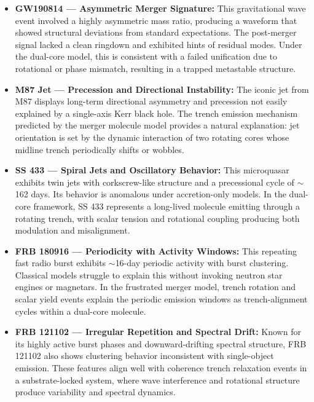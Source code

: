 \documentclass[sn-mathphys]{sn-jnl}
\theoremstyle{thmstyleone}%
\theoremstyle{thmstyletwo}%
\theoremstyle{thmstylethree}%
\begin{document}
\begin{itemize}

\item \textbf{GW190814\cite{Abbott2020} --- Asymmetric Merger Signature:}  
This gravitational wave event involved a highly asymmetric mass ratio, producing a waveform that showed structural deviations from standard expectations. The post-merger signal lacked a clean ringdown and exhibited hints of residual modes. Under the dual-core model, this is consistent with a failed unification due to rotational or phase mismatch, resulting in a trapped metastable structure.

\item \textbf{M87\cite{EHT2019} Jet --- Precession and Directional Instability:}  
The iconic jet from M87 displays long-term directional asymmetry and precession not easily explained by a single-axis Kerr black hole. The trench emission mechanism predicted by the merger molecule model provides a natural explanation: jet orientation is set by the dynamic interaction of two rotating cores whose midline trench periodically shifts or wobbles.

\item \textbf{SS 433\cite{Blundell2001} --- Spiral Jets and Oscillatory Behavior:}  
This microquasar exhibits twin jets with corkscrew-like structure and a precessional cycle of $\sim$162 days. Its behavior is anomalous under accretion-only models. In the dual-core framework, SS 433 represents a long-lived molecule emitting through a rotating trench, with scalar tension and rotational coupling producing both modulation and misalignment.

\item \textbf{FRB 180916\cite{CHIME2020} --- Periodicity with Activity Windows:}  
This repeating fast radio burst exhibits $\sim$16-day periodic activity with burst clustering. Classical models struggle to explain this without invoking neutron star engines or magnetars. In the frustrated merger model, trench rotation and scalar yield events explain the periodic emission windows as trench-alignment cycles within a dual-core molecule.

\item \textbf{FRB 121102\cite{CHIME2020} --- Irregular Repetition and Spectral Drift:}  
Known for its highly active burst phases and downward-drifting spectral structure, FRB 121102 also shows clustering behavior inconsistent with single-object emission. These features align well with coherence trench relaxation events in a substrate-locked system, where wave interference and rotational structure produce variability and spectral dynamics.

\end{itemize}
\end{document}
